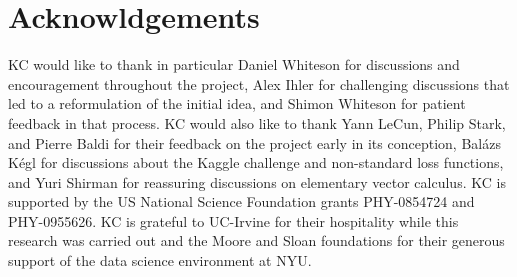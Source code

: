 \documentclass[11pt, oneside]{article}   	%
\begin{document}
\section*{Acknowldgements}
KC would like to thank in particular 
Daniel Whiteson for discussions and encouragement throughout the project, 
Alex Ihler for challenging discussions that 
led to a reformulation of the initial idea, and Shimon Whiteson for patient feedback in that process. 
KC would also like to thank Yann LeCun, Philip Stark, and Pierre Baldi for their feedback on the
project early in its conception, Bal\'azs K\'egl for discussions about the Kaggle challenge and 
non-standard loss functions, and Yuri Shirman for reassuring discussions on elementary vector calculus.
KC is supported by the US National Science Foundation grants PHY-0854724 and PHY-0955626. 
KC is grateful to UC-Irvine for their hospitality while this research was carried out and the 
Moore and Sloan foundations for their generous support of the data science environment at NYU.
\end{document}
